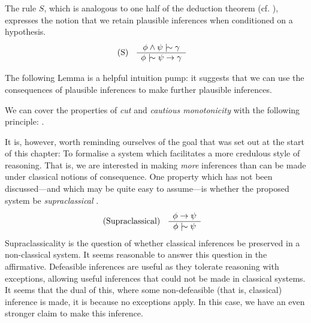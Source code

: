 The rule $S$, which is analogous to one half of the deduction theorem (cf. ), expresses the
notion that we retain plausible inferences when conditioned on a hypothesis.
%
\begin{align}
	\inferLeft{S}{\phi \land \psi \twiddle \gamma}{\phi \twiddle \psi \rightarrow \gamma}
\end{align}

The following Lemma is a helpful intuition pump: it suggests that we can use the consequences of plausible inferences to
make further plausible inferences.
%
\begin{lemma}
	\label{lemma:cut-cautious}

	We can cover the properties of \emph{cut} and \emph{cautious monotonicity} with the following principle: .
\end{lemma}



It is, however, worth reminding ourselves of the goal that was set out at the start of this chapter: To formalise a system
which facilitates a more credulous style of reasoning. That is, we are interested in making \textit{more} inferences
than can be made under classical notions of consequence. One property which has not been discussed---and which may be quite
easy to assume---is whether the proposed system be \textit{supraclassical} \cite{makinson2003bridges}.
%
\begin{align}
	\label{postulate:supraclassical}\inferLeft{Supraclassical}{\phi \rightarrow \psi}{\phi \twiddle \psi}
\end{align}
%
Supraclassicality is the question of whether classical inferences be preserved in a non-classical system. It seems
reasonable to answer this question in the affirmative. Defeasible inferences are useful as they tolerate reasoning with exceptions,
allowing useful inferences that could not be made in classical systems. It seems that the dual of this, where some non-defeasible
(that is, classical) inference is made, it is because no exceptions apply. In this case, we have an even stronger claim
to make this inference.

